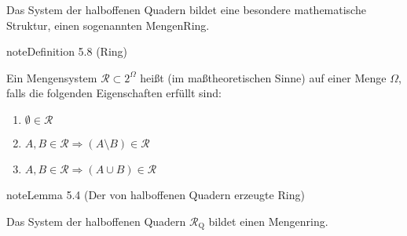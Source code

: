 \documentclass[letterpaper,10pt,english]{jupyterBook}
\begin{document}
\sphinxAtStartPar
Das System der halboffenen Quadern bildet eine besondere mathematische Struktur, einen sogenannten Mengen\sphinxhyphen{}Ring.
\label{masstheorie/masstheorie:def:ring}
\begin{sphinxadmonition}{note}{Definition 5.8 (Ring)}



\sphinxAtStartPar
Ein Mengensystem \(\mathcal{R} \subset 2^{\Omega}\) heißt  (im maßtheoretischen Sinne) auf einer Menge \(\Omega\), falls die folgenden Eigenschaften erfüllt sind:
\begin{enumerate}
%
\item {} 
\sphinxAtStartPar
\(\emptyset \in \mathcal{R}\)

\item {} 
\sphinxAtStartPar
\(A,B \in \mathcal{R} \Rightarrow (A \setminus B) \in \mathcal{R}\)

\item {} 
\sphinxAtStartPar
\(A,B \in \mathcal{R} \Rightarrow (A \cup B) \in \mathcal{R}\)

\end{enumerate}
\end{sphinxadmonition}
\label{masstheorie/masstheorie:lemma-14}
\begin{sphinxadmonition}{note}{Lemma 5.4 (Der von halboffenen Quadern erzeugte Ring)}



\sphinxAtStartPar
Das System der halboffenen Quadern \(\mathcal{R}_{\text{Q}}\) bildet einen Mengenring.
\end{sphinxadmonition}
\end{document}
